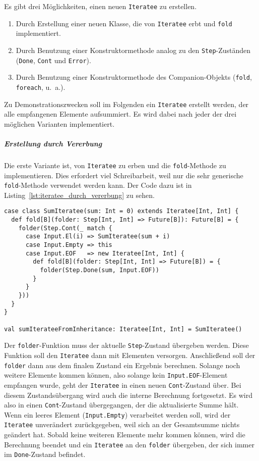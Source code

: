 \documentclass[draft=false
              ,paper=a4
              ,twoside=false
              ,fontsize=11pt
              ,headsepline
              ,BCOR10mm
              ,DIV11
              ]{scrbook}
\begin{document}
Es gibt drei Möglichkeiten, einen neuen \lstinline|Iteratee| zu erstellen.
\begin{enumerate}
  \item Durch Erstellung einer neuen Klasse, die von \lstinline|Iteratee| erbt und \lstinline|fold| implementiert.
  \item Durch Benutzung einer Konstruktormethode analog zu den \lstinline|Step|-Zuständen (\lstinline|Done|, \lstinline|Cont| und \lstinline|Error|).
  \item Durch Benutzung einer Konstruktormethode des Companion-Objekts (\lstinline|fold|, \lstinline|foreach|, u.~a.).
\end{enumerate}

Zu Demonstrationszwecken soll im Folgenden ein \lstinline|Iteratee| erstellt werden, der alle empfangenen Elemente aufsummiert.
Es wird dabei nach jeder der drei möglichen Varianten implementiert.

\subparagraph{Erstellung durch Vererbung} %
\label{subp:erstellung_durch_vererbung}\mbox{} %

Die erste Variante ist, von \lstinline|Iteratee| zu erben und die \lstinline|fold|-Methode zu implementieren.
Dies erfordert viel Schreibarbeit, weil nur die sehr generische \lstinline|fold|-Methode verwendet werden kann.
Der Code dazu ist in Listing~\ref{lst:iteratee_durch_vererbung} zu sehen.

\begin{lstlisting}[caption=Erstellung eines Iteratees durch Vererbung, label=lst:iteratee_durch_vererbung]
case class SumIteratee(sum: Int = 0) extends Iteratee[Int, Int] {
  def fold[B](folder: Step[Int, Int] => Future[B]): Future[B] = {
    folder(Step.Cont(_ match {
      case Input.El(i) => SumIteratee(sum + i)
      case Input.Empty => this
      case Input.EOF   => new Iteratee[Int, Int] {
        def fold[B](folder: Step[Int, Int] => Future[B]) = {
          folder(Step.Done(sum, Input.EOF))
        }
      }
    }))
  }
}

val sumIterateeFromInheritance: Iteratee[Int, Int] = SumIteratee()
\end{lstlisting}

Der \lstinline|folder|-Funktion muss der aktuelle \lstinline|Step|-Zustand übergeben werden.
Diese Funktion soll den \lstinline|Iteratee| dann mit Elementen versorgen.
Anschließend soll der \lstinline|folder| dann aus dem finalen Zustand ein Ergebnis berechnen.
Solange noch weitere Elemente kommen können, also solange kein \lstinline|Input.EOF|-Element empfangen wurde, geht der \lstinline|Iteratee| in einen neuen \lstinline|Cont|-Zustand über.
Bei diesem Zustandsübergang wird auch die interne Berechnung fortgesetzt.
Es wird also in einen \lstinline|Cont|-Zustand übergegangen, der die aktualisierte Summe hält.
Wenn ein leeres Element (\lstinline|Input.Empty|) verarbeitet werden soll, wird der \lstinline|Iteratee| unverändert zurückgegeben, weil sich an der Gesamtsumme nichts geändert hat.
Sobald keine weiteren Elemente mehr kommen können, wird die Berechnung beendet und ein \lstinline|Iteratee| an den \lstinline|folder| übergeben, der sich immer im \lstinline|Done|-Zustand befindet.
\end{document}
